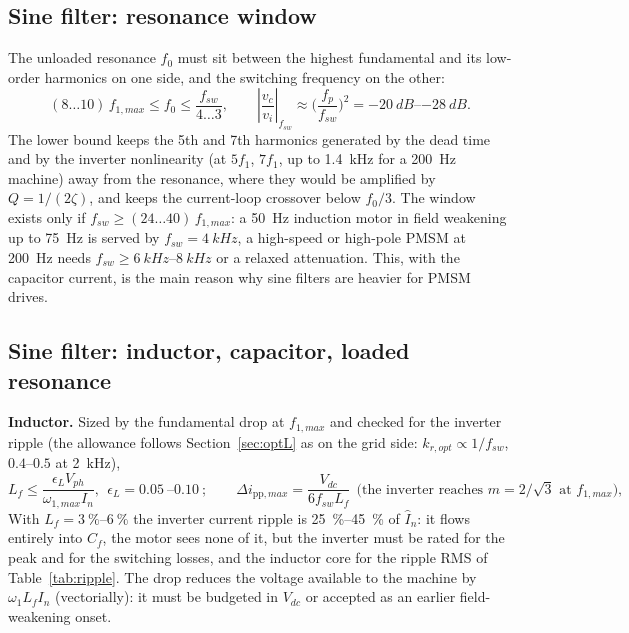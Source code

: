 \documentclass[10pt,a4paper]{scrartcl}
\newcommand{\Vdc}{V_{dc}}
\newcommand{\fsw}{f_{sw}}
\newcommand{\Cf}{C_{f}}
\newcommand{\Lf}{L_{f}}
\newcommand{\pp}{\mathrm{pp}}
\begin{document}
\begin{onehalfspace}
\subsection{Sine filter: resonance window}
The unloaded resonance $f_0$ must sit between the highest fundamental and its low-order harmonics on one side, and the switching frequency on the other:
\begin{equation}
(8 \ldots 10)\,f_{1,max} \le f_0 \le \frac{\fsw}{4 \ldots 3},\qquad
\left|\frac{v_c}{v_i}\right|_{\fsw} \approx \Big(\frac{f_p}{\fsw}\Big)^2 = \SIrange{-20}{-28}{dB}.
\label{eq:window}
\end{equation}
The lower bound keeps the 5th and 7th harmonics generated by the dead time and by the inverter nonlinearity (at $5f_1$, $7f_1$, up to \SI{1.4}{kHz} for a \SI{200}{Hz} machine) away from the resonance, where they would be amplified by $Q = 1/(2\zeta)$, and keeps the current-loop crossover below $f_0/3$. The window exists only if $\fsw \ge (24 \ldots 40)\,f_{1,max}$: a \SI{50}{Hz} induction motor in field weakening up to \SI{75}{Hz} is served by $\fsw = \SI{4}{kHz}$, a high-speed or high-pole PMSM at \SI{200}{Hz} needs $\fsw \ge \SIrange{6}{8}{kHz}$ or a relaxed attenuation. This, with the capacitor current, is the main reason why sine filters are heavier for PMSM drives.

\subsection{Sine filter: inductor, capacitor, loaded resonance}
\textbf{Inductor.} Sized by the fundamental drop at $f_{1,max}$ and checked for the inverter ripple (the allowance follows Section~\ref{sec:optL} as on the grid side: $k_{r,opt} \propto 1/\fsw$, $0.4$--$0.5$ at \SI{2}{kHz}),
\begin{equation}
\Lf \le \frac{\epsilon_L V_{ph}}{\omega_{1,max} I_n},\ \ \epsilon_L = \SIrange{0.05}{0.10}{};\qquad
\Delta i_{\pp,max} = \frac{\Vdc}{6\fsw\Lf}\ \ \text{(the inverter reaches } m = 2/\sqrt3 \text{ at } f_{1,max}),
\label{eq:Lf}
\end{equation}
With $\Lf = \SIrange{3}{6}{\percent}$ the inverter current ripple is \SIrange{25}{45}{\percent} of $\hat I_n$: it flows entirely into $\Cf$, the motor sees none of it, but the inverter must be rated for the peak and for the switching losses, and the inductor core for the ripple RMS of Table~\ref{tab:ripple}. The drop reduces the voltage available to the machine by $\omega_1 \Lf I_n$ (vectorially): it must be budgeted in $\Vdc$ or accepted as an earlier field-weakening onset.


\end{onehalfspace}
\end{document}
